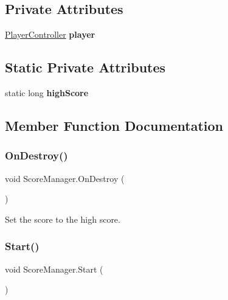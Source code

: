 \subsection*{Private Attributes}
\begin{DoxyCompactItemize}
\item 
\hypertarget{class_score_manager_ad8713d178a336dcc454d1fb4c92bf87c}{}\label{class_score_manager_ad8713d178a336dcc454d1fb4c92bf87c} 
\hyperlink{class_player_controller}{Player\+Controller} {\bfseries player}
\end{DoxyCompactItemize}
\subsection*{Static Private Attributes}
\begin{DoxyCompactItemize}
\item 
\hypertarget{class_score_manager_a025e45d18af2eef0ab8b78e4da444cbf}{}\label{class_score_manager_a025e45d18af2eef0ab8b78e4da444cbf} 
static long {\bfseries high\+Score}
\end{DoxyCompactItemize}


\subsection{Member Function Documentation}
\hypertarget{class_score_manager_adb4d6e4602f332f02156e43410fd12a8}{}\label{class_score_manager_adb4d6e4602f332f02156e43410fd12a8} 
\subsubsection{\texorpdfstring{On\+Destroy()}{OnDestroy()}}
{\footnotesize\ttfamily void Score\+Manager.\+On\+Destroy (\begin{DoxyParamCaption}{ }\end{DoxyParamCaption})\hspace{0.3cm}{\ttfamily [private]}}



Set the score to the high score. 

\hypertarget{class_score_manager_a2d8e7dd8928c4fa7feb1a020971b69ac}{}\label{class_score_manager_a2d8e7dd8928c4fa7feb1a020971b69ac} 
\subsubsection{\texorpdfstring{Start()}{Start()}}
{\footnotesize\ttfamily void Score\+Manager.\+Start (\begin{DoxyParamCaption}{ }\end{DoxyParamCaption})\hspace{0.3cm}{\ttfamily [private]}}



